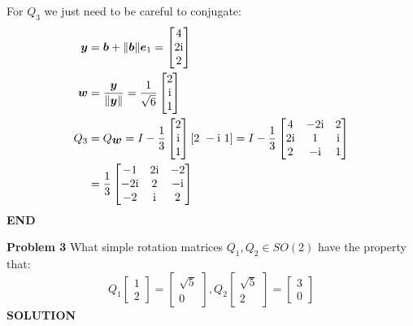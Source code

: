 \documentclass[12pt,a4paper]{article}
\def\b{ {\vc b} }
\def\e{ {\vc e} }
\def\y{ {\vc y} }
\def\w{ {\vc w} }
\begin{document}
For $Q_3$ we just need to be careful to conjugate:
\begin{align*}
\ensuremath{\bm{\y}} &= \ensuremath{\bm{\b}} + \| \ensuremath{\bm{\b}}\| \ensuremath{\bm{\e}}_1 =  \begin{bmatrix} 4 \\ 2{\rm i} \\ 2 \end{bmatrix} \\
\ensuremath{\bm{\w}} &= {\ensuremath{\bm{\y}} \over \|\ensuremath{\bm{\y}}\|} = {1 \over \sqrt{6}} \begin{bmatrix}2 \\ {\rm i} \\ 1 \end{bmatrix} \\
Q_3 &= Q_{\ensuremath{\bm{\w}}} = I - {1 \over 3} \begin{bmatrix} 2 \\ {\rm i} \\ 1 \end{bmatrix}  [2\ -{\rm i}\ 1] = 
I - {1 \over 3} \begin{bmatrix} 4 & -2{\rm i} & 2 \\ 
                                2{\rm i}& 1 & {\rm i} \\ 
                                2 &-{\rm i} & 1 \end{bmatrix} \\
&={1 \over 3} \begin{bmatrix} -1 & 2{\rm i} & -2 \\ 
                            -2{\rm i} & 2 & -{\rm i} \\ 
                            -2& {\rm i} & 2 \end{bmatrix} 
\end{align*}
\textbf{END}

\textbf{Problem 3} What simple rotation matrices $Q_1,Q_2 \ensuremath{\in} SO(2)$ have the property that:
\[
Q_1 \begin{bmatrix} 1 \\ 2 \end{bmatrix} =\begin{bmatrix} \sqrt{5} \\ 0 \end{bmatrix},  Q_2 \begin{bmatrix} \sqrt{5} \\ 2 \end{bmatrix} =  \begin{bmatrix} 3 \\ 0 \end{bmatrix}
\]
\textbf{SOLUTION}
\end{document}
